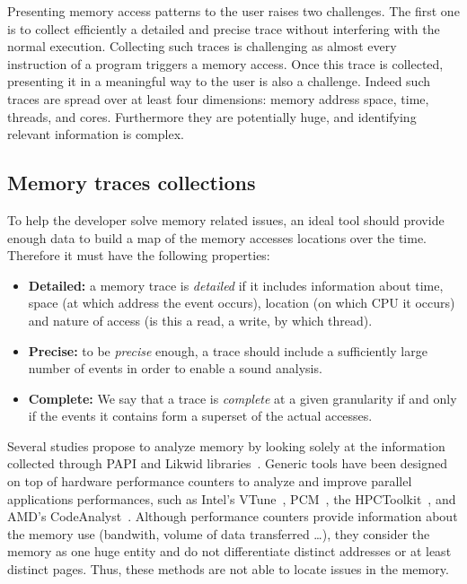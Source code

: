 Presenting memory access patterns to the user raises two challenges.
The first one is to collect efficiently a detailed and precise trace without interfering with the normal execution.
Collecting such traces is challenging as almost every instruction of a program triggers a memory access.
Once this trace is collected, presenting it in a meaningful way to the user is also a challenge.
Indeed such traces are spread over at least four dimensions: memory address space, time, threads, and cores.
Furthermore they are potentially huge, and identifying relevant information is complex.

\subsection{Memory traces collections}

To help the developer solve memory related issues, an ideal tool should provide enough data to build a map of the memory accesses locations over the time.
Therefore it must have the following properties:
\label{def:traces}
\begin{itemize}
    \item  \textbf{Detailed:}  a memory trace is \emph{detailed} if it includes information about time, space (at which address the event occurs), location (on which CPU it occurs) and nature of access (is this a read, a write, by which thread).
    \item \textbf{Precise:} to be \emph{precise} enough, a trace should include a sufficiently large number of events in order to enable a sound analysis.
    \item \textbf{Complete:} We say that a trace is \emph{complete} at a given granularity if and only if the events it contains form a superset of the actual accesses.
\end{itemize}

Several studies propose to analyze memory  by looking solely at the information collected through \gls{PAPI} and \gls{Likwid} libraries~\cite{Majo13(Mis)understanding, Jiang14Understanding,Bosch00Rivet,Weyers14Visualization,Tao01Visualizing,DeRose01Hardware}.
Generic tools have been designed on top of hardware performance counters to analyze and improve parallel applications performances, such as Intel's \gls{VTune}~\cite{Reinders05VTune}, \gls{PCM}~\cite{Wilhalm12Intel}, the \gls{HPCToolkit}~\cite{Adhianto10HPCTOOLKIT}, and AMD's \gls{CodeAnalyst}~\cite{Drongowski08introduction}.
Although performance counters provide information about the memory use (bandwith, volume of data transferred \ldots),  they consider the memory as one huge entity and do not differentiate distinct addresses or at least distinct pages.
Thus, these methods are not able to locate issues in the memory.

